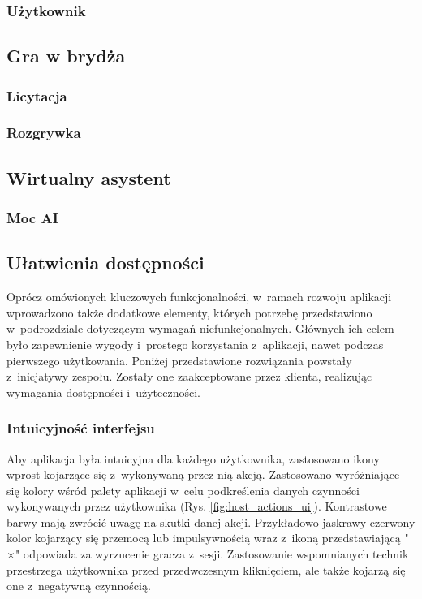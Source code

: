 \subsubsection{Użytkownik}


\subsection{Gra w brydża}

\subsubsection{Licytacja}
\subsubsection{Rozgrywka}


\subsection{Wirtualny asystent}

\subsubsection{Moc AI}


\subsection{Ułatwienia dostępności}

Oprócz omówionych kluczowych funkcjonalności, w~ramach rozwoju
aplikacji wprowadzono także dodatkowe elementy, których
potrzebę przedstawiono w~podrozdziale dotyczącym wymagań
niefunkcjonalnych. Głównych ich celem było zapewnienie
wygody i~prostego korzystania z~aplikacji, nawet podczas
pierwszego użytkowania. Poniżej przedstawione rozwiązania powstały
z~inicjatywy zespołu. Zostały one zaakceptowane przez klienta,
realizując wymagania dostępności i~użyteczności.

\subsubsection{Intuicyjność interfejsu}

Aby aplikacja była intuicyjna dla każdego użytkownika,
zastosowano ikony wprost kojarzące się z~wykonywaną
przez nią akcją. Zastosowano wyróżniające się kolory wśród palety
aplikacji w~celu podkreślenia danych czynności wykonywanych
przez użytkownika (Rys. \ref{fig:host_actions_ui}). Kontrastowe barwy mają zwrócić uwagę na
skutki danej akcji. Przykładowo jaskrawy czerwony kolor
kojarzący się przemocą lub impulsywnością wraz z~ikoną
przedstawiającą "$\times$"\xspace odpowiada za wyrzucenie gracza
z~sesji. Zastosowanie wspomnianych technik przestrzega
użytkownika przed przedwczesnym kliknięciem, ale także kojarzą
się one z~negatywną czynnością.

